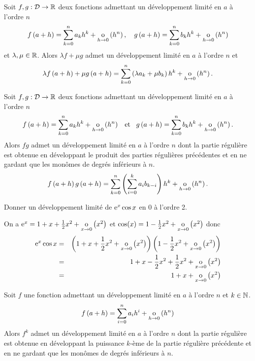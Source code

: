 \documentclass{magnoliaold}
\begin{document}
\begin{proposition}[utile=-3]
Soit $f,g:\mathcal{D}\to\mathbb{R}$ deux fonctions admettant un développement limité en
$a$ à l'ordre $n$
\[f\left(a+h\right)=\sum_{k=0}^n a_k h^k+\underset{h \rightarrow 0}{\text{o}}\left(h^n\right),\quad
  g\left(a+h\right)=\sum_{k=0}^n b_k h^k+\underset{h \rightarrow 0}{\text{o}}\left(h^n\right)\]
et $\lambda,\mu\in\mathbb{R}$. Alors $\lambda f+\mu g$ admet un développement limité en
$a$ à l'ordre $n$ et
\[\lambda f\left(a+h\right)+\mu g\left(a+h\right)=
  \sum_{k=0}^n \left(\lambda a_k+\mu b_k\right) h^k+\underset{h \rightarrow 0}{\text{o}}\left(h^n\right).\]
\end{proposition}

\begin{proposition}[utile=-3]
Soit $f,g:\mathcal{D}\to\mathbb{R}$ deux fonctions admettant un développement limité en
$a$ à l'ordre $n$
\[f\left(a+h\right)=\sum_{k=0}^n a_k h^k+\underset{h \rightarrow 0}{\text{o}}\left(h^n\right) \quad\!\text{et}\quad\!
  g\left(a+h\right)=\sum_{k=0}^n b_k h^k+\underset{h \rightarrow 0}{\text{o}}\left(h^n\right).\]
Alors $fg$ admet un développement limité en $a$ à l'ordre $n$ dont la
partie régulière est obtenue en développant le produit des parties régulières
précédentes et en ne gardant que les monômes de degrés inférieurs à $n$.
\[f\left(a+h\right)g\left(a+h\right)=\sum_{k=0}^n \left(\sum_{i=0}^k a_i b_{k-i}\right) h^k+\underset{h \rightarrow 0}{\text{o}}\left(h^n\right).\]
\end{proposition}

\begin{exoUnique}
\exo Donner un développement limité de ${\rm e}^x \cos x$ en 0 à l'ordre 2.
\end{exoUnique}

\begin{sol}
On a ${\rm e}^x=1+x+\frac{1}{2}x^2+\underset{x \rightarrow 0}{\text{o}}\left(x^2\right)$ et $\cos(x)=1-\frac{1}{2}x^2+\underset{x \rightarrow 0}{\text{o}}\left(x^2\right)$ donc 
\begin{eqnarray*}
{\rm e}^x \cos x&=&\left(1+x+\frac{1}{2}x^2+\underset{x \rightarrow 0}{\text{o}}\left(x^2\right)\right)\left(1-\frac{1}{2}x^2+\underset{x \rightarrow 0}{\text{o}}\left(x^2\right)\right)\\
&=&1+x-\frac{1}{2}x^2+\frac{1}{2}x^2+\underset{x \rightarrow 0}{\text{o}}\left(x^2\right)\\
&=&1+x+\underset{x \rightarrow 0}{\text{o}}\left(x^2\right)
\end{eqnarray*}
\end{sol}



\begin{proposition}[utile=-3]
Soit $f$ une fonction admettant un développement limité en $a$ à
l'ordre $n$ et $k\in\mathbb{N}$.
\[f\left(a+h\right)=\sum_{i=0}^n a_i h^i+\underset{h \rightarrow 0}{\text{o}}\left(h^n\right)\]
Alors $f^k$ admet un développement limité en $a$ à l'ordre $n$ dont
la partie régulière est obtenue en développant la puissance $k$-ème de la partie
régulière précédente et en ne gardant que les monômes de degrés inférieurs à
$n$.
\end{proposition}
\end{document}
